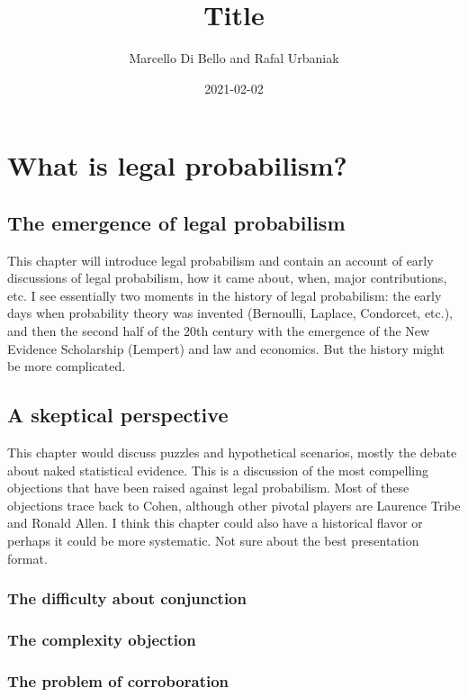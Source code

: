 \documentclass[]{book}
\title{Title}
\author{Marcello Di Bello and Rafal Urbaniak}
\date{2021-02-02}
\begin{document}
\maketitle

{
\setcounter{tocdepth}{1}
\tableofcontents
}
\part{What is legal probabilism?}

\chapter{The emergence of legal probabilism}

This chapter will introduce legal probabilism and contain an account of early\\
discussions of legal probabilism, how
it came about, when, major contributions, etc.
I see essentially two moments in
the history of legal probabilism: the early days when probability
theory was invented (Bernoulli, Laplace, Condorcet, etc.), and then
the second half of the 20th century with the emergence
of the New Evidence Scholarship (Lempert)
and law and economics. But the history
might be more complicated.

\chapter{A skeptical perspective}

This chapter would discuss puzzles and
hypothetical scenarios, mostly the debate
about naked statistical evidence. This
is a discussion of the most compelling objections that have
been raised against legal probabilism.
Most of these objections
trace back to Cohen, although
other pivotal players
are Laurence Tribe and Ronald Allen.
I think this chapter could
also have a historical flavor or perhaps it could be more
systematic. Not sure about
the best presentation format.

\section{The difficulty about conjunction}

\section{The complexity objection}

\section{The problem of corroboration}
\end{document}
